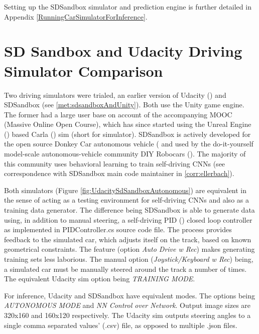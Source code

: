 Setting up the SDSandbox simulator and prediction engine is further detailed in Appendix \ref{RunningCarSimulatorForInference}.


\section{SD Sandbox and Udacity Driving Simulator Comparison}

Two driving simulators were trialed, an earlier version of Udacity (\cite{UdacityCarSim}) and SDSandbox (see \ref{met:sdsandboxAndUnity}). Both use the Unity game engine. The former had a large user base on account of the accompanying MOOC (Massive Online Open Course), which has since started using the Unreal Engine (\cite{unrealengine}) based Carla (\cite{Dosovitskiy17}) sim (short for simulator). SDSandbox is actively developed for the open source Donkey Car autonomous vehicle (\cite{DonkeyCar2020} and used by the do-it-yourself model-scale autonomous-vehicle community DIY Robocars (\cite{DIYRobocars2020}). The majority of this community uses behavioral learning to train self-driving CNNs (see correspondence with SDSandbox main code maintainer in \ref{corr:ellerbach}).  
 
Both simulators (Figure \ref{fig:UdacitySdSandboxAutonomous}) are equivalent in the sense of acting as a testing environment for self-driving CNNs and also as a training data generator. The difference being SDSandbox is able to generate data using, in addition to manual steering, a self-driving PID (\cite{bennett1993development}) closed loop controller as implemented in PIDController.cs source code file. The process provides feedback to the simulated car, which adjusts itself on the track, based on known geometrical constraints. The feature (option \textit{Auto Drive w Rec}) makes generating training sets less laborious. The manual option (\textit{Joystick/Keyboard w Rec}) being, a simulated car must be manually steered around the track a number of times. The equivalent Udacity sim option being \textit{TRAINING MODE}.

For inference, Udacity and SDSandbox have equivalent modes. The options being   
\textit{AUTONOMOUS MODE} and \textit{NN Control over Network}. Output image sizes are 320x160 and 160x120 respectively. The Udacity sim outputs steering angles to a single comma separated values' (.csv) file, as opposed to multiple .json files. 

